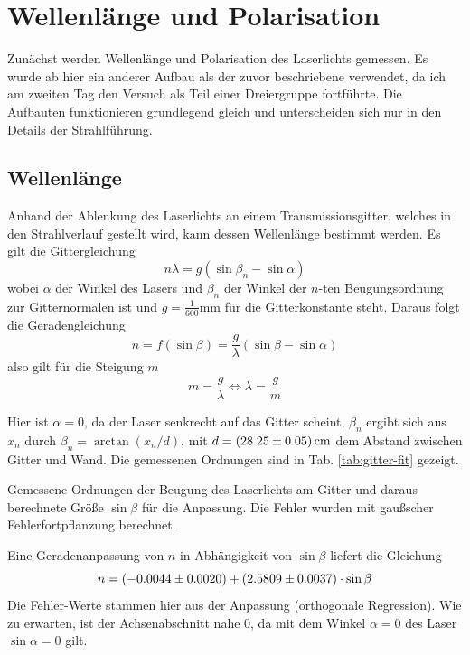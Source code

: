 \documentclass{article}
\newcommand*{\tablePath}{../data} %
\begin{document}
\section{Wellenlänge und Polarisation}
Zunächst werden Wellenlänge und Polarisation des Laserlichts gemessen.
Es wurde ab hier ein anderer Aufbau als der zuvor beschriebene verwendet, da ich am zweiten Tag den Versuch als Teil
einer Dreiergruppe fortführte.
Die Aufbauten funktionieren grundlegend gleich und unterscheiden sich nur in den Details der Strahlführung.

\subsection{Wellenlänge}
Anhand der Ablenkung des Laserlichts an einem Transmissionsgitter, welches in den Strahlverlauf gestellt wird,
kann dessen Wellenlänge bestimmt werden.
Es gilt die Gittergleichung
\begin{equation}
  n\lambda = g(\sin \beta_n - \sin \alpha)
\end{equation}
wobei $\alpha$ der Winkel des Lasers und $\beta_n$ der Winkel der $n$-ten Beugungsordnung zur Gitternormalen ist
und $g = \frac{1}{600}\si\mm$ für die Gitterkonstante steht. 
Daraus folgt die Geradengleichung
\begin{equation}
  n = f(\sin\beta) = \frac{g}{\lambda} (\sin \beta - \sin \alpha)
\end{equation}
also gilt für die Steigung $m$
\[
  m = \frac{g}{\lambda} \iff \lambda = \frac{g}{m}
\]

Hier ist $\alpha=0$, da der Laser senkrecht auf das Gitter scheint,
$\beta_n$ ergibt sich aus $x_n$ durch $\beta_n = \arctan(x_n/d)$, mit $d=\SI{28.25\pm0.05}{\cm}$
dem Abstand zwischen Gitter und Wand. Die gemessenen Ordnungen sind in Tab. \ref{tab:gitter-fit} gezeigt.

\begin{table}[h]
  \centering
  
  \caption{ Gemessene Ordnungen der Beugung des Laserlichts am Gitter und daraus berechnete Größe $\sin\beta$ für die Anpassung.
  Die Fehler wurden mit gaußscher Fehlerfortpflanzung berechnet. }
  \label{tab:gitter-fit}
\end{table}

Eine Geradenanpassung von $n$ in Abhängigkeit von $\sin \beta$ liefert die Gleichung
\[
  n = (\num{-0.0044\pm0.0020}) + (\num{2.5809\pm0.0037}) \cdot \sin\beta
\]
Die Fehler-Werte stammen hier aus der Anpassung (orthogonale Regression).
Wie zu erwarten, ist der Achsenabschnitt nahe 0, da mit dem Winkel $\alpha=0$ des Laser $\sin\alpha = 0$ gilt.
\end{document}
